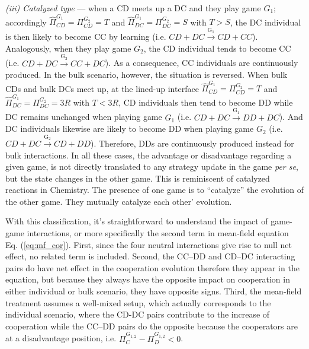\documentclass[showpacs,superscriptaddress,reprint,nofootinbib,amsmath,amssymb,aps,pre]{revtex4-1}
\begin{document}
\emph{(iii) Catalyzed type} --- when a CD meets up a DC and they play game $G_1$; accordingly $\widehat{\Pi}_{CD}^{G_1}\!=\!\Pi_{CD}^{G_2}=T$ and $\widehat{\Pi}_{DC}^{G_1}\!=\!\Pi_{DC}^{G_2}=S$ with $T > S$, the DC individual is then likely to become CC by learning (i.e. $CD+DC \xrightarrow{\text{G}_1} CD+CC$). Analogously, when they play game $G_2$, the CD individual tends to become CC (i.e. $CD+DC \xrightarrow{\text{G}_2} CC+DC$). As a consequence, CC individuals are continuously produced. 
In the bulk scenario, however, the situation is reversed. 
When bulk CDs and bulk DCs meet up, at the lined-up interface $\widehat{\Pi}_{CD}^{G_1}= \Pi_{CD}^{G_2}=T$ and $\widehat{\Pi}_{DC}^{G_1}= \Pi_{DC}^{G_2}=3R$ with $T < 3R$, CD individuals then tend to become DD while DC remains unchanged when playing game $G_1$ (i.e. $CD+DC \xrightarrow{\text{G}_1} DD+DC$). And DC individuals likewise are likely to become DD when playing game $G_2$ (i.e. $CD+DC \xrightarrow{\text{G}_2} CD+DD$). Therefore, DDs are continuously produced instead for bulk interactions. 
In all these cases, the advantage or disadvantage regarding a given game, is not directly translated to any strategy update in the game \emph{per se}, but the state changes in the other game. This is reminiscent of catalyzed reactions in Chemistry. The presence of one game is to ``catalyze'' the evolution of the other game. They mutually catalyze each other' evolution. 

With this classification, it's straightforward to understand the impact of game-game interactions, or more specifically the second term in mean-field equation Eq. (\ref{eq:mf_cor}). First, since the four neutral interactions give rise to null net effect, no related term is included. Second, the CC--DD and CD--DC interacting pairs do have net effect in the cooperation evolution therefore they appear in the equation, but because they always have the opposite impact on cooperation in either individual or bulk scenario, they have opposite signs. Third, the mean-field treatment assumes a well-mixed setup, which actually corresponds to the individual scenario, where the CD-DC pairs contribute to the increase of cooperation while the CC--DD pairs do the opposite because the cooperators are at a disadvantage position, i.e. $\Pi^{G_{1,2}}_C-\Pi^{G_{1,2}}_D<0$.
\end{document}
